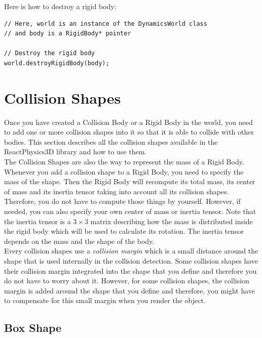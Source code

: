\documentclass[a4paper,12pt]{article}
\begin{document}
    Here is how to destroy a rigid body: \\

    \begin{lstlisting}
// Here, world is an instance of the DynamicsWorld class
// and body is a RigidBody* pointer

// Destroy the rigid body
world.destroyRigidBody(body);
  \end{lstlisting}

    \section{Collision Shapes}
    \label{sec:collisionshapes}

    Once you have created a Collision Body or a Rigid Body in the world, you need to add one or more collision shapes into it so that it is able to collide with other bodies.
    This section describes all the collision shapes available in the ReactPhysics3D library and how to use them. \\

    The Collision Shapes are also the way to represent the mass of a Rigid Body. Whenever you add a collision shape to a Rigid Body, you need to specify the mass of the shape.
    Then the Rigid Body will recompute its total mass, its center of mass and its inertia tensor taking into account all its collision shapes. Therefore, you do not have to compute
    those things by yourself. However, if needed, you can also specify your own center of mass or inertia tensor. Note that the inertia tensor is a $3 \times 3$ matrix describing
    how the mass is distributed inside the rigid body which will be used to calculate its rotation. The inertia tensor depends on the mass and the shape of the body. \\

    Every collision shapes use a \emph{collision margin} which is a small distance around the shape that is used internally in the collision detection.
    Some collision shapes have their collision margin integrated into the shape that you define and therefore you do not have to worry about it.
    However, for some collision shapes, the collision margin is added around the shape that you define and therefore, you might have to compensate
    for this small margin when you render the object. \\

    \subsection{Box Shape}
\end{document}
